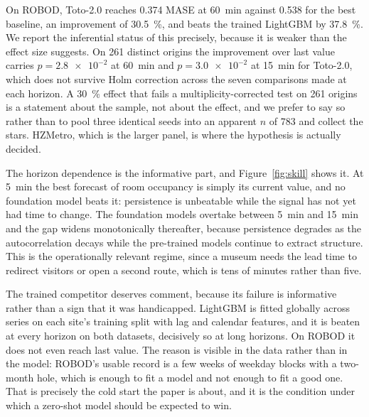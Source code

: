 \documentclass[11pt]{article}
\theoremstyle{plain}
\theoremstyle{definition}
\theoremstyle{remark}
\begin{document}
On ROBOD, Toto-2.0 reaches \num{0.374} MASE at \SI{60}{\minute} against \num{0.538} for the best baseline, an improvement of \SI{30.5}{\percent}, and beats the trained LightGBM by \SI{37.8}{\percent}. We report the inferential status of this precisely, because it is weaker than the effect size suggests. On \num{261} distinct origins the improvement over last value carries $p=\num{2.8e-2}$ at \SI{60}{\minute} and $p=\num{3.0e-2}$ at \SI{15}{\minute} for Toto-2.0, which does not survive Holm correction across the seven comparisons made at each horizon. A \SI{30}{\percent} effect that fails a multiplicity-corrected test on \num{261} origins is a statement about the sample, not about the effect, and we prefer to say so rather than to pool three identical seeds into an apparent $n$ of \num{783} and collect the stars. HZMetro, which is the larger panel, is where the hypothesis is actually decided.

The horizon dependence is the informative part, and Figure~\ref{fig:skill} shows it. At \SI{5}{\minute} the best forecast of room occupancy is simply its current value, and no foundation model beats it: persistence is unbeatable while the signal has not yet had time to change. The foundation models overtake between \SI{5}{\minute} and \SI{15}{\minute} and the gap widens monotonically thereafter, because persistence degrades as the autocorrelation decays while the pre-trained models continue to extract structure. This is the operationally relevant regime, since a museum needs the lead time to redirect visitors or open a second route, which is tens of minutes rather than five.

The trained competitor deserves comment, because its failure is informative rather than a sign that it was handicapped. LightGBM is fitted globally across series on each site's training split with lag and calendar features, and it is beaten at every horizon on both datasets, decisively so at long horizons. On ROBOD it does not even reach last value. The reason is visible in the data rather than in the model: ROBOD's usable record is a few weeks of weekday blocks with a two-month hole, which is enough to fit a model and not enough to fit a good one. That is precisely the cold start the paper is about, and it is the condition under which a zero-shot model should be expected to win.
\end{document}
